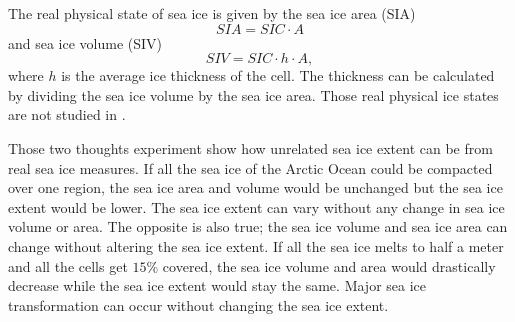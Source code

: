 %


The real physical state of sea ice is given by the sea ice area (SIA)
\begin{equation}
SIA = SIC \cdot A
\end{equation}
and sea ice volume (SIV)
\begin{equation}
SIV = SIC\cdot h \cdot A,
\end{equation}
where $h$ is the average ice thickness of the cell. The thickness can be calculated by dividing the sea ice volume by the sea ice area. Those real physical ice states are not studied in \cite{ISI:000242942100008}.

Those two thoughts experiment show how unrelated sea ice extent can be from real sea ice measures. If all the sea ice of the Arctic Ocean could be compacted over one region, the sea ice area and volume would be unchanged but the sea ice extent would be lower. The sea ice extent can vary without any change in sea ice volume or area. The opposite is also true; the sea ice volume and sea ice area can change without altering the sea ice extent. If all the sea ice melts to half a meter and all the cells get $15\%$ covered, the sea ice volume and area would drastically decrease while the sea ice extent would stay the same. Major sea ice transformation can occur without changing the sea ice extent.  

